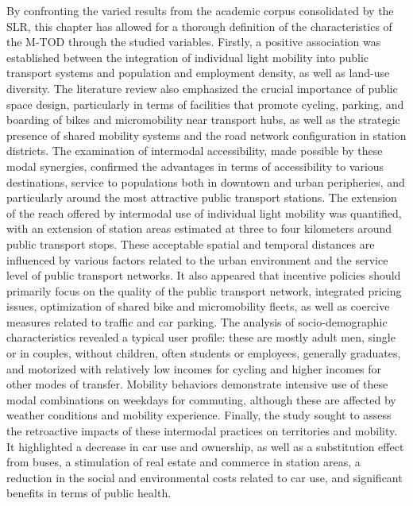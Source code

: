 \begin{refsegment}
By confronting the varied results from the academic corpus consolidated by the \acrshort{SLR}, this chapter has allowed for a thorough definition of the characteristics of the \acrshort{M-TOD} through the studied variables. Firstly, a positive association was established between the integration of individual light mobility into public transport systems and population and employment density, as well as land-use diversity. The literature review also emphasized the crucial importance of public space design, particularly in terms of facilities that promote cycling, parking, and boarding of bikes and micromobility near transport hubs, as well as the strategic presence of shared mobility systems and the road network configuration in station districts. The examination of intermodal accessibility, made possible by these modal synergies, confirmed the advantages in terms of accessibility to various destinations, service to populations both in downtown and urban peripheries, and particularly around the most attractive public transport stations. The extension of the reach offered by intermodal use of individual light mobility was quantified, with an extension of station areas estimated at three to four kilometers around public transport stops. These acceptable spatial and temporal distances are influenced by various factors related to the urban environment and the service level of public transport networks. It also appeared that incentive policies should primarily focus on the quality of the public transport network, integrated pricing issues, optimization of shared bike and micromobility fleets, as well as coercive measures related to traffic and car parking. The analysis of socio-demographic characteristics revealed a typical user profile: these are mostly adult men, single or in couples, without children, often students or employees, generally graduates, and motorized with relatively low incomes for cycling and higher incomes for other modes of transfer. Mobility behaviors demonstrate intensive use of these modal combinations on weekdays for commuting, although these are affected by weather conditions and mobility experience. Finally, the study sought to assess the retroactive impacts of these intermodal practices on territories and mobility. It highlighted a decrease in car use and ownership, as well as a substitution effect from buses, a stimulation of real estate and commerce in station areas, a reduction in the social and environmental costs related to car use, and significant benefits in terms of public health.%


\end{refsegment}
